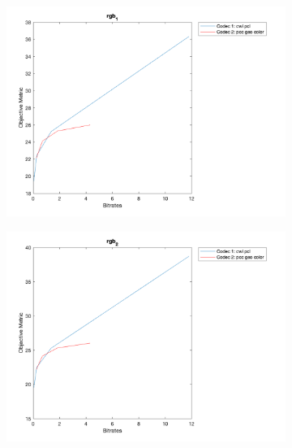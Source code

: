 \documentclass{article}
\begin{document}
\begin{figure}
     \ContinuedFloat
    \begin{subfigure}[b]{0.65\textwidth}
    \includegraphics[width=\textwidth]{Figures/task2/guanyin_rgb1.png}
    \end{subfigure} 
    \begin{subfigure}[b]{0.65\textwidth}
    \includegraphics[width=\textwidth]{Figures/task2/guanyin_rgb2.png}
    \end{subfigure}
    

\end{figure}
\end{document}
